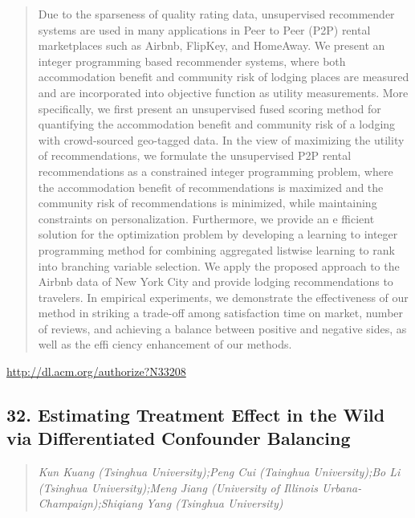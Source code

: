 \documentclass{article}
\begin{document}
\begin{quote}
Due to the sparseness of quality rating data, unsupervised recommender systems are used in many applications in Peer to Peer (P2P) rental marketplaces such as Airbnb, FlipKey, and HomeAway. We present an integer programming based recommender systems, where both accommodation benefit and community risk of lodging places are measured and are incorporated into objective function as utility measurements. More specifically, we first present an unsupervised fused scoring method for quantifying the accommodation benefit and community risk of a lodging with crowd-sourced geo-tagged data. In the view of maximizing the utility of recommendations, we formulate the unsupervised P2P rental recommendations as a constrained integer programming problem, where the accommodation benefit of recommendations is maximized and the community risk of recommendations is minimized, while maintaining constraints on personalization. Furthermore, we provide an e fficient solution for the optimization problem by developing a learning to integer programming method for combining aggregated listwise learning to rank into branching variable selection. We apply the proposed approach to the Airbnb data of New York City and provide lodging recommendations to travelers. In empirical experiments, we demonstrate the effectiveness of our method in striking a trade-off among satisfaction time on market, number of reviews, and achieving a balance between positive and negative sides, as well as the effi ciency enhancement of our methods.
\end{quote}

\href{http://dl.acm.org/authorize?N33208}{http://dl.acm.org/authorize?N33208}

\subsection{32. Estimating Treatment Effect in the Wild via Differentiated Confounder Balancing}

\begin{quote}
\footnotesize{\textit{Kun Kuang (Tsinghua University);Peng Cui (Tainghua University);Bo Li (Tsinghua University);Meng Jiang (University of Illinois Urbana-Champaign);Shiqiang Yang (Tsinghua University)}}

\end{quote}
\end{document}
